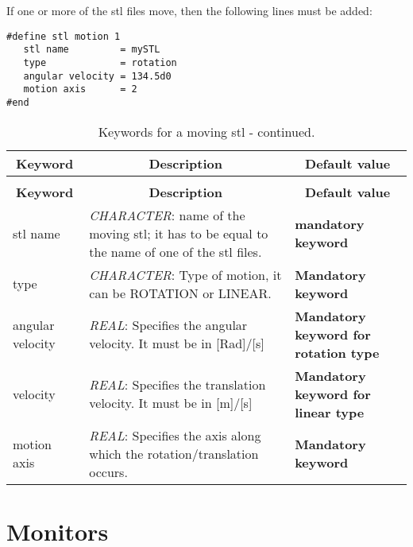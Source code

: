 \documentclass[a4paper,10pt]{report}
\begin{document}
If one or more of the stl files move, then the following lines must be added:
\begin{lstlisting}
#define stl motion 1
   stl name         = mySTL
   type             = rotation 
   angular velocity = 134.5d0
   motion axis      = 2
#end
\end{lstlisting}

\begin{longtable}{|p{4cm}|p{10cm}|p{2.2cm}|}
\caption{Keywords for a moving stl.} \label{tab:movingstl} \\
\hline
\multicolumn{1}{|c|}{\textbf{Keyword}} & \multicolumn{1}{c|}{\textbf{Description}} & \multicolumn{1}{c|}{\textbf{Default value}} \\ \hline
\endfirsthead

\caption{Keywords for a moving stl - continued.} \\
\hline
\multicolumn{1}{|c|}{\textbf{Keyword}} & \multicolumn{1}{c|}{\textbf{Description}} & \multicolumn{1}{c|}{\textbf{Default value}} \\ \hline
\endhead

stl name & \textit{CHARACTER}: name of the moving stl; it has to be equal to the name of one of the stl files. & \textbf{mandatory keyword} \\ \hline

type & \textit{CHARACTER}: Type of motion, it can be ROTATION or LINEAR. & \textbf{Mandatory keyword} \\ \hline

angular velocity & \textit{REAL}: Specifies the angular velocity. It must be in [Rad]/[s] & \textbf{Mandatory keyword for rotation type} \\ \hline

velocity & \textit{REAL}: Specifies the translation velocity. It must be in [m]/[s] & \textbf{Mandatory keyword for linear type} \\ \hline

motion axis & \textit{REAL}: Specifies the axis along which the rotation/translation occurs. & \textbf{Mandatory keyword} \\ \hline

\end{longtable}



\chapter{Monitors}~\label{sect:monitors}
\end{document}
